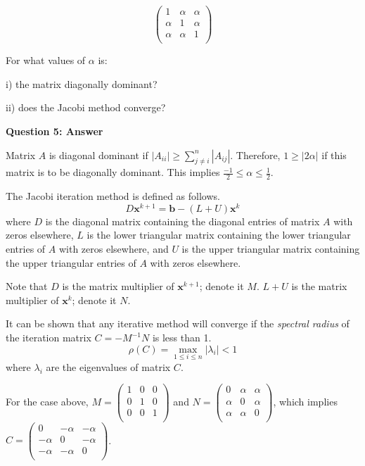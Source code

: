 \documentclass[12pt]{article}
\begin{document}
\begin{equation}
	\begin{pmatrix}
       1 & \alpha & \alpha \\[0.3em]
       \alpha& 1 & \alpha \\[0.3em]
       \alpha& \alpha & 1			  \\[0.3em]
  \end{pmatrix}
\end{equation}

For what values of $\alpha$ is:

i) the matrix diagonally dominant?

ii) does the Jacobi method converge?

\textbf{Question 5: Answer}

Matrix $A$ is diagonal dominant if $|A_{ii}| \geq \sum_{j \neq i}^{n} |A_{ij}|$. Therefore, $1 \geq |2 \alpha|$ if this matrix is to be diagonally dominant. This implies $\frac{-1}{2} \leq \alpha \leq \frac{1}{2}$.

The Jacobi iteration method is defined as follows. 
$$D \boldsymbol{x}^{k+1} = \boldsymbol{b} - (L+U) \boldsymbol{x}^k $$
where $D$ is the diagonal matrix containing the diagonal entries of matrix $A$ with zeros elsewhere, $L$ is the lower triangular matrix containing the lower triangular entries of $A$ with zeros elsewhere, and $U$ is the upper triangular matrix containing the upper triangular entries of $A$ with zeros elsewhere.

Note that $D$ is the matrix multiplier of $\boldsymbol{x}^{k+1}$; denote it $M$. $L+U$ is the matrix multiplier of $\boldsymbol{x}^k$; denote it $N$.

It can be shown that any iterative method will converge if the \textit{spectral radius} of the iteration matrix $C=-M^{-1}N$ is less than 1.
\begin{equation}
\label{eq:spectral}
\rho (C) = \max\limits_{1 \leq i \leq n}|\lambda _i|<1
\end{equation}
where $\lambda_i$ are the eigenvalues of matrix $C$.

For the case above, $M = \begin{pmatrix}1 & 0 & 0 \\[0.3em]
0 & 1 & 0 \\[0.3em]
0 & 0 & 1\\[0.3em]\end{pmatrix}$ and $ N = \begin{pmatrix}
0 & \alpha & \alpha \\[0.3em]\alpha& 0 & \alpha \\[0.3em]
\alpha& \alpha & 0 \\[0.3em]\end{pmatrix}$, which implies $C=\begin{pmatrix}
0 & -\alpha & -\alpha \\[0.3em]
-\alpha& 0 & -\alpha \\[0.3em]
-\alpha& -\alpha & 0	\\[0.3em]\end{pmatrix}$.
  
\end{document}

